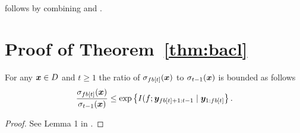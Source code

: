 \noindent{} follows by combining 
and .

\section{Proof of Theorem~\ref*{thm:bacl}} \label{app:bacl}
\begin{lemma}
\label{lem:cmi}
For any $\bm{x} \in D$ and $t \geq 1$
the ratio of $\sigma_{fb[t]}(\bm{x})$ to $\sigma_{t-1}(\bm{x})$ is bounded
as follows
\begin{align*}
\frac{\sigma_{fb[t]}(\bm{x})}{\sigma_{t-1}(\bm{x})} \leq \exp\left\{I(f; \bm{y}_{fb[t]+1:t-1} \mid \bm{y}_{1:fb[t]}\right\}.
\end{align*}
\end{lemma}
\begin{proof}
See Lemma 1 in \cite{desautels12}.
\end{proof}

